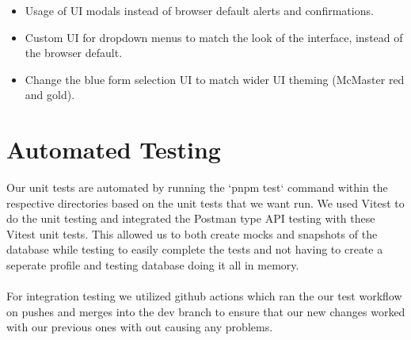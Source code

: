 \documentclass[12pt, titlepage]{article}
\begin{document}
\begin{itemize}
    \item Usage of UI modals instead of browser default alerts and confirmations.
    \item Custom UI for dropdown menus to match the look of the interface, instead of the browser default.
    \item Change the blue form selection UI to match wider UI theming (McMaster red and gold).
\end{itemize}

\section{Automated Testing}
Our unit tests are automated by running the `pnpm test` command within the respective directories based on the unit tests that we want run. We used Vitest to do the unit testing and integrated the Postman type API testing with these Vitest unit tests. This allowed us to both create mocks and snapshots of the database while testing to easily complete the tests and not having to create a seperate profile and testing database doing it all in memory.\\
\\
For integration testing we utilized github actions which ran the our test workflow on pushes and merges into the dev branch to ensure that our new changes worked with our previous ones with out causing any problems.
\end{document}
